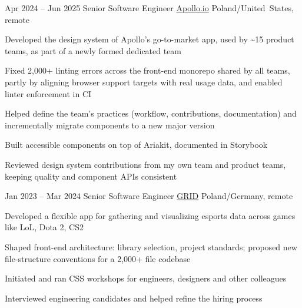 \begin{sectionlist}
    \jobentry
        {Apr 2024 -- Jun 2025}
        {Senior Software Engineer}
        {\href{https://www.apollo.io}{Apollo.io}}
        {Poland/United~States, remote}
        {
            \begin{jobentrylist}
                \item Developed the design system of Apollo’s go-to-market app,
                  used by \textasciitilde{}15 product teams, as part of a
                  newly formed dedicated team
                \item Fixed 2,000+ linting errors across the front-end monorepo
                  shared by all teams, partly by aligning browser support targets
                  with real usage data, and enabled linter enforcement in CI
                \item Helped define the team’s practices (workflow,
                  contributions, documentation) and incrementally migrate
                  components to a new major version
                \item Built accessible components on top of Ariakit, documented
                  in Storybook
                \item Reviewed design system contributions from my own team and
                  product teams, keeping quality and component APIs consistent
            \end{jobentrylist}
        }

    \jobentry
        {Jan 2023 -- Mar 2024}
        {Senior Software Engineer}
        {\href{https://grid.gg}{GRID}}
        {Poland/Germany, remote}
        {
            \begin{jobentrylist}
                \item Developed a flexible app for gathering and visualizing
                    esports data across games like LoL, Dota 2, CS2
                \item Shaped front-end architecture: library selection, project
                    standards; proposed new file-structure conventions for a 2,000+
                    file codebase
                \item Initiated and ran CSS workshops for engineers, designers
                    and other colleagues
                \item Interviewed engineering candidates and helped refine the
                    hiring process
            \end{jobentrylist}
        }


\end{sectionlist}
